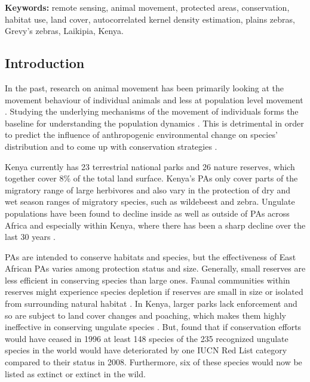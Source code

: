 \documentclass[12pt,a4paper, twoside, english]{article}
\begin{document}
\textbf{Keywords:} remote sensing, animal movement, protected areas, conservation, habitat use, land cover, autocorrelated kernel density estimation, plains zebras, Grevy's zebras, Laikipia, Kenya.

\subsection{Introduction}

In the past, research on animal movement has been primarily looking at the movement behaviour of individual animals \citep{Nathan2008} and less at population level movement \citep{Mueller2011}. Studying the underlying mechanisms of the movement of individuals forms the baseline for understanding the population dynamics \citep{Mueller2008}. This is detrimental in order to predict the influence of anthropogenic environmental change on species' distribution and to come up with conservation strategies \citep{Demsar2015}.

Kenya currently has 23 terrestrial national parks and 26 nature reserves, which together cover 8\% of the total land surface. Kenya's PAs only cover parts of the migratory range of large herbivores and also vary in the protection of dry and wet season ranges of migratory species, such as wildebeest and zebra. Ungulate populations have been found to decline inside as well as outside of PAs across Africa and especially within Kenya, where there has been a sharp decline over the last 30 years \citep{Western2009}. 

PAs are intended to conserve habitats and species, but the effectiveness of East African PAs varies among protection status \citep{Pfeifer2012} and size. Generally, small reserves are less efficient in conserving species than large ones. Faunal communities within reserves might experience species depletion if reserves are small in size or isolated from surrounding natural habitat \citep{Miller1977}. In Kenya, larger parks lack enforcement and so are subject to land cover changes and poaching, which makes them highly ineffective in conserving ungulate species \citep{Western2009}. But, \cite{Hoffmann2015} found that if conservation efforts would have ceased in 1996 at least 148 species of the 235 recognized ungulate species in the world would have deteriorated by one IUCN Red List category compared to their status in 2008. Furthermore, six of these species would now be listed as extinct or extinct in the wild.
\end{document}
